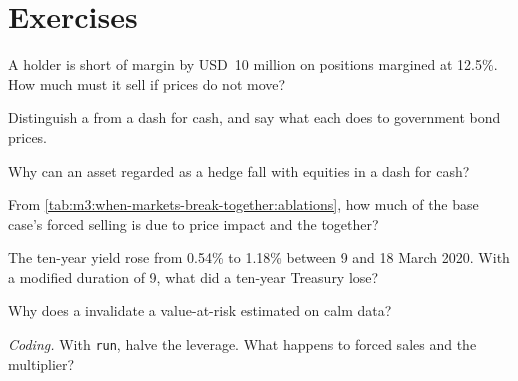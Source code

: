 \section{Exercises}

\begin{exercise}[$\star$]\label{exo:m3:when-markets-break-together:1}
A holder is short of margin by USD~10 million on positions margined at 12.5\%. How much must it sell if prices do not move?
\end{exercise}

\begin{exercise}[$\star$]\label{exo:m3:when-markets-break-together:2}
Distinguish a  from a dash for cash, and say what each does to government bond prices.
\end{exercise}

\begin{exercise}[$\star$]\label{exo:m3:when-markets-break-together:3}
Why can an asset regarded as a hedge fall with equities in a dash for cash?
\end{exercise}

\begin{exercise}[$\star\star$]\label{exo:m3:when-markets-break-together:4}
From \cref{tab:m3:when-markets-break-together:ablations}, how much of the base case's forced selling is due to price impact and the  together?
\end{exercise}

\begin{exercise}[$\star\star$]\label{exo:m3:when-markets-break-together:5}
The ten-year yield rose from 0.54\% to 1.18\% between 9 and 18 March 2020. With a modified duration of 9, what did a ten-year Treasury lose?
\end{exercise}

\begin{exercise}[$\star\star$]\label{exo:m3:when-markets-break-together:6}
Why does a  invalidate a value-at-risk estimated on calm data?
\end{exercise}

\begin{exercise}[$\star\star\star$]\label{exo:m3:when-markets-break-together:7}
\emph{Coding.} With \texttt{run}, halve the leverage. What happens to forced sales and the multiplier?
\end{exercise}

